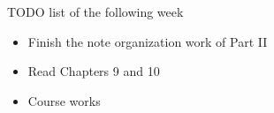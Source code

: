 \documentclass[working]{article}
\begin{document}


\begin{framed}{\large
TODO list of the following week
\begin{itemize}
    \item Finish the note organization work of Part II
    \item Read Chapters 9 and 10
    \item Course works
\end{itemize}
}
\end{framed}













\listnotes

\end{document}

